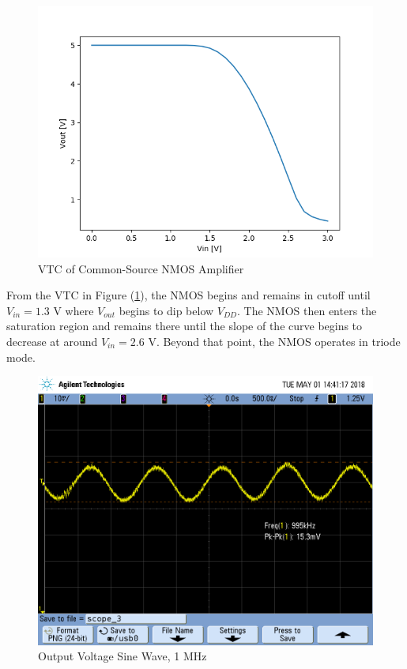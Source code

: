 \begin{figure}[h!]
	\centering
	\includegraphics[scale=0.75]{./images/sim2_vtc.PNG}
	\caption{VTC of Common-Source NMOS Amplifier}
	\label{fig:part2_vtc}
\end{figure}

\FloatBarrier

From the VTC in Figure (\ref{fig:part2_vtc}), the NMOS begins and remains in cutoff until $V_{in} = 1.3$ \si{\volt} where $V_{out}$ begins to dip below $V_{DD}$.
The NMOS then enters the saturation region and remains there until the slope of the curve begins to decrease at around $V_{in} = 2.6$ \si{\volt}.
Beyond that point, the NMOS operates in triode mode. \\

\FloatBarrier

\begin{figure}[h!]
	\centering
	\includegraphics[scale=0.3]{./images/SCOPE_3.PNG}
	\caption{Output Voltage Sine Wave, 1 \si{\mega\hertz}}
	\label{fig:1mhz_original}
\end{figure}

